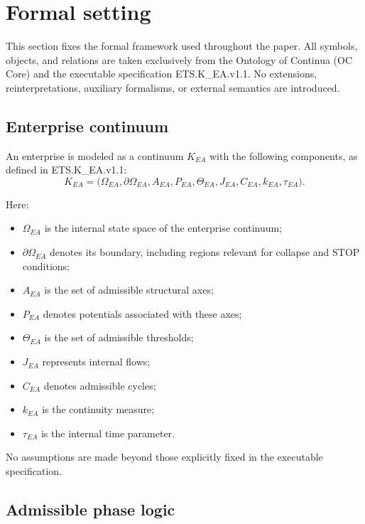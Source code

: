 \section{Formal setting}
\label{sec:formal-setting}

This section fixes the formal framework used throughout the paper.
All symbols, objects, and relations are taken exclusively from the
Ontology of Continua (OC Core) and the executable specification
ETS.K\_EA.v1.1. No extensions, reinterpretations, auxiliary formalisms,
or external semantics are introduced.

\subsection{Enterprise continuum}
\label{subsec:enterprise-continuum}

An enterprise is modeled as a continuum $K_{EA}$ with the following
components, as defined in ETS.K\_EA.v1.1:
\[
K_{EA} =
\bigl(
\Omega_{EA},
\partial\Omega_{EA},
A_{EA},
P_{EA},
\Theta_{EA},
J_{EA},
C_{EA},
k_{EA},
\tau_{EA}
\bigr).
\]

Here:
\begin{itemize}
\item $\Omega_{EA}$ is the internal state space of the enterprise
      continuum;
\item $\partial\Omega_{EA}$ denotes its boundary, including regions
      relevant for collapse and STOP conditions;
\item $A_{EA}$ is the set of admissible structural axes;
\item $P_{EA}$ denotes potentials associated with these axes;
\item $\Theta_{EA}$ is the set of admissible thresholds;
\item $J_{EA}$ represents internal flows;
\item $C_{EA}$ denotes admissible cycles;
\item $k_{EA}$ is the continuity measure;
\item $\tau_{EA}$ is the internal time parameter.
\end{itemize}

No assumptions are made beyond those explicitly fixed in the executable
specification.

\subsection{Admissible phase logic}
\label{subsec:phase-logic}

